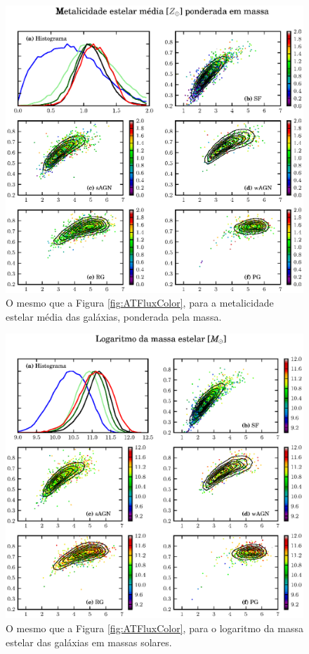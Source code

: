 \begin{figure}
	\includegraphics{figuras/uvcolor-color-am_mass-byclass.eps}
	\caption[Metalicidade estelar média ponderada em massa no diagrama cor--cor.]
	{O mesmo que a Figura \ref{fig:ATFluxColor}, para a metalicidade estelar média
	das galáxias, ponderada pela massa.}
	\label{fig:AMMassColor}
\end{figure}

\begin{figure}
	\includegraphics{figuras/uvcolor-color-mcor_gal-byclass.eps}
	\caption[Massa estelar das galáxias no diagrama cor--cor.]
	{O mesmo que a Figura \ref{fig:ATFluxColor}, para o logaritmo da massa estelar
	das galáxias em massas solares.}
	\label{fig:MCorGalColor}
\end{figure}

